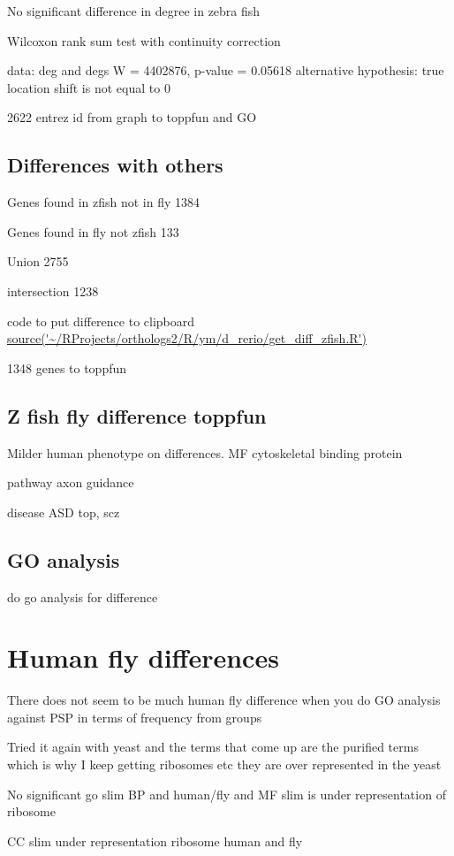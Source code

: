     No significant difference in degree in zebra fish
    
    
	Wilcoxon rank sum test with continuity correction

data:  deg and degs
W = 4402876, p-value = 0.05618
alternative hypothesis: true location shift is not equal to 0

2622 entrez id from graph to toppfun and GO
\subsection{Differences with others}
Genes found in zfish not in fly 1384

Genes found in fly not zfish 133

Union 2755

intersection 1238

code to put difference to clipboard \url{source('~/RProjects/orthologs2/R/ym/d_rerio/get_diff_zfish.R')}

1348 genes to toppfun

\subsection{Z fish fly difference toppfun}
Milder human phenotype on differences. MF cytoskeletal binding protein 

pathway axon guidance

disease ASD top, scz


\subsection{GO analysis}
do go analysis for difference



    


\section{Human fly differences}

There does not seem to be much human fly difference when you do GO analysis against PSP in terms of frequency from groups

Tried it again with yeast and the terms that come up are the purified terms which is why I keep getting ribosomes etc they are over represented in the yeast

No significant go slim BP and human/fly and MF slim is under representation of ribosome

CC slim under representation ribosome human and fly


